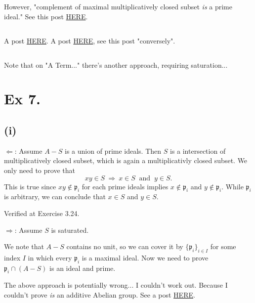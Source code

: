 However, "complement of maximal multiplicatively closed subset \textit{is} a prime ideal." See this post \href{https://math.stackexchange.com/questions/3704318/complement-of-multiplicative-set-is-a-prime-ideal}{HERE}. 

\subsection{}
A post \href{https://math.stackexchange.com/questions/25739/complement-of-maximal-multiplicative-set-is-a-prime-ideal}{HERE}. A post \href{https://math.stackexchange.com/questions/3962023/atiyah-macdonald-exercise-3-6}{HERE}, see this post "conversely". 

\subsection{}

Note that on "A Term..." there's another approach, requiring saturation... 

\section{Ex 7.}\label{Atiyah Chapter 3 Ex 7}

\subsection{(i)}

$\Leftarrow$: Assume $A-S$ is a union of prime ideals. Then $S$ is a intersection of multiplicatively closed subset, which is again a multiplicativly closed subset. We only need to prove that 
$$xy\in S ~\Rightarrow~ x\in S ~\text{ and }~ y\in S.$$
This is true since $xy\notin \mathfrak p_i$ for each prime ideals implies $x\notin\mathfrak p_i$ and $y\notin\mathfrak p_i$. While $\mathfrak p_i$ is arbitrary, we can conclude that $x\in S$ and $y\in S$.

Verified at \cite{altman} Exercise 3.24. 

$\Rightarrow$: Assume $S$ is saturated. 

We note that $A-S$ contains no unit, so we can cover it by $\{\mathfrak p_i\}_{i\in I}$ for some index $I$ in which every $\mathfrak p_i$ is a maximal ideal. 
Now we need to prove $\mathfrak p_i\cap (A-S)$ is an ideal and prime. 

The above approach is potentially wrong... I couldn't work out. Because I couldn't prove \textit{is} an additive Abelian group. 
See a post \href{https://math.stackexchange.com/questions/4329999/saturated-set-and-union-of-prime-ideals}{HERE}. 

